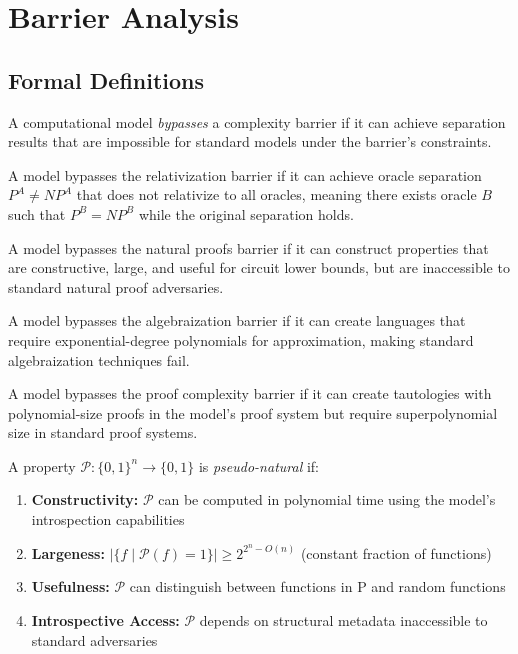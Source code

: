 \documentclass[11pt]{article}
\begin{document}
\section{Barrier Analysis}

\subsection{Formal Definitions}

\begin{definition}
A computational model \textit{bypasses} a complexity barrier if it can achieve separation results that are impossible for standard models under the barrier's constraints.
\end{definition}

\begin{definition}
A model bypasses the relativization barrier if it can achieve oracle separation $P^A \neq NP^A$ that does not relativize to all oracles, meaning there exists oracle $B$ such that $P^B = NP^B$ while the original separation holds.
\end{definition}

\begin{definition}
A model bypasses the natural proofs barrier if it can construct properties that are constructive, large, and useful for circuit lower bounds, but are inaccessible to standard natural proof adversaries.
\end{definition}

\begin{definition}
A model bypasses the algebraization barrier if it can create languages that require exponential-degree polynomials for approximation, making standard algebraization techniques fail.
\end{definition}

\begin{definition}
A model bypasses the proof complexity barrier if it can create tautologies with polynomial-size proofs in the model's proof system but require superpolynomial size in standard proof systems.
\end{definition}

\begin{definition}
A property $\mathcal{P}: \{0,1\}^n \to \{0,1\}$ is \textit{pseudo-natural} if:
\begin{enumerate}
\item \textbf{Constructivity:} $\mathcal{P}$ can be computed in polynomial time using the model's introspection capabilities
\item \textbf{Largeness:} $|\{f \mid \mathcal{P}(f) = 1\}| \geq 2^{2^n - O(n)}$ (constant fraction of functions)
\item \textbf{Usefulness:} $\mathcal{P}$ can distinguish between functions in $\text{P}$ and random functions
\item \textbf{Introspective Access:} $\mathcal{P}$ depends on structural metadata inaccessible to standard adversaries
\end{enumerate}
\end{definition}
\end{document}
